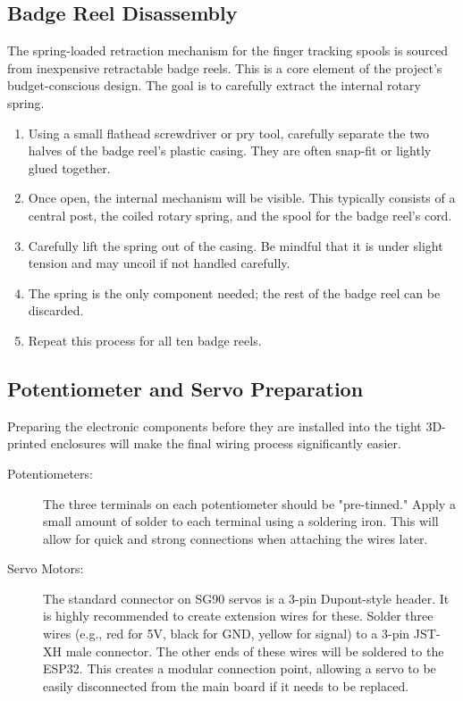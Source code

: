 \documentclass{article}
\begin{document}
\subsection{Badge Reel Disassembly}
The spring-loaded retraction mechanism for the finger tracking spools is sourced from inexpensive retractable badge reels. This is a core element of the project's budget-conscious design. The goal is to carefully extract the internal rotary spring.
\begin{enumerate}
    \item Using a small flathead screwdriver or pry tool, carefully separate the two halves of the badge reel's plastic casing. They are often snap-fit or lightly glued together.
    \item Once open, the internal mechanism will be visible. This typically consists of a central post, the coiled rotary spring, and the spool for the badge reel's cord.
    \item Carefully lift the spring out of the casing. Be mindful that it is under slight tension and may uncoil if not handled carefully.
    \item The spring is the only component needed; the rest of the badge reel can be discarded.
    \item Repeat this process for all ten badge reels.
\end{enumerate}

\subsection{Potentiometer and Servo Preparation}
Preparing the electronic components before they are installed into the tight 3D-printed enclosures will make the final wiring process significantly easier.
\begin{description}
    \item[Potentiometers:] The three terminals on each potentiometer should be "pre-tinned." Apply a small amount of solder to each terminal using a soldering iron. This will allow for quick and strong connections when attaching the wires later.
    \item[Servo Motors:] The standard connector on SG90 servos is a 3-pin Dupont-style header. It is highly recommended to create extension wires for these. Solder three wires (e.g., red for 5V, black for GND, yellow for signal) to a 3-pin JST-XH male connector. The other ends of these wires will be soldered to the ESP32. This creates a modular connection point, allowing a servo to be easily disconnected from the main board if it needs to be replaced.
\end{description}
\end{document}
